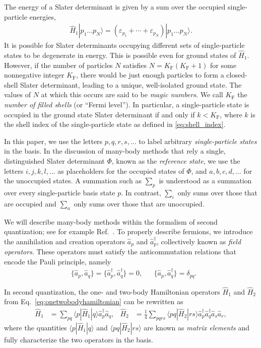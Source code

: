 The energy of a Slater determinant is given by a sum over the occupied single-particle energies,
\begin{align*}
  \hat{H}_1 | p_1 \ldots p_N \rangle = (\varepsilon_{p_1} + \cdots + \varepsilon_{p_N}) | p_1 \ldots p_N \rangle.
\end{align*}
It is possible for Slater determinants occupying different sets of single-particle states to be degenerate in energy.  This is possible even for ground states of $\hat{H}_1$.  However, if the number of particles $N$ satisfies $N = K_{\mathrm{F}} (K_{\mathrm{F}} + 1)$ for some nonnegative integer $K_{\mathrm{F}}$, there would be just enough particles to form a closed-shell Slater determinant, leading to a unique, well-isolated ground state.  The values of $N$ at which this occurs are said to be \textit{magic numbers}.  We call $K_{\mathrm{F}}$ the \textit{number of filled shells} (or ``Fermi level'').  In particular, a single-particle state is occupied in the ground state Slater determinant if and only if $k < K_{\mathrm{F}}$, where $k$ is the shell index of the single-particle state as defined in \eqref{eq:shell_index}.

In this paper, we use the letters $p, q, r, s, \ldots$ to label arbitrary \textit{single-particle states} in the basis.  In the discussion of many-body methods that rely a single, distinguished Slater determinant $\Phi$, known as the \textit{reference state}, we use the letters $i, j, k, l, \ldots$ as placeholders for the occupied states of $\Phi$, and $a, b, c, d, \ldots$ for the unoccupied states.  A summation such as $\sum_p$ is understood as a summation over every single-particle basis state $p$.  In contrast, $\sum_i$ only sums over those that are occupied and $\sum_a$ only sums over those that are unoccupied.

We will describe many-body methods within the formalism of second quantization; see for example Ref.\ \cite{shavitt2009many}.  To properly describe fermions, we introduce the annihilation and creation operators $\hat a_p$ and $\hat a_p^\dagger$, collectively known as \textit{field operators}. These operators must satisfy the anticommutation relations that encode the Pauli principle, namely
\begin{align*}
  &\{\hat a_p, \hat a_q\} = \{\hat a_p^\dagger, \hat a_q^\dagger\} = 0, &
  &\{\hat a_p, \hat a_q^\dagger\} = \delta_{p q}.
\end{align*}

In second quantization, the one- and two-body Hamiltonian operators $\hat{H}_1$ and $\hat{H}_2$ from Eq.\ \eqref{eq:onetwobodyhamiltonian} can be rewritten as
\begin{align} \label{eq:second_quantized_hamiltonian}
  \hat{H}_1 &= \sum_{p q} \langle p | \hat{H}_1 | q \rangle \hat a_p^\dagger \hat a_q^{}, &
  \hat{H}_2 &= \frac{1}{4} \sum_{p q r s} \langle p q | \hat{H}_2 | r s \rangle \hat a_p^\dagger \hat a_q^\dagger \hat a_s^{} \hat a_r^{},
\end{align}
where the quantities $\langle p | \hat{H}_1 | q \rangle$ and $\langle p q | \hat{H}_2 | r s \rangle$ are known as \textit{matrix elements} and fully characterize the two operators in the basis.

